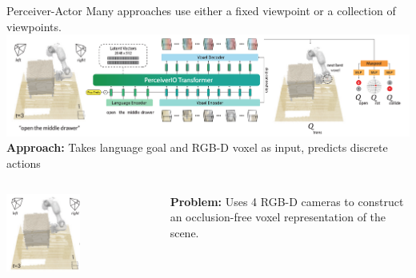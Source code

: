\documentclass{beamer}
\begin{document}
\begin{frame}[t]{Perceiver-Actor}
    \vspace{-1em}
    Many approaches use either a fixed viewpoint or a collection of viewpoints.
    \includegraphics[width=\textwidth]{./img/motivation_peract_0.png}
    \textbf{Approach:} Takes language goal and RGB-D voxel as input, predicts discrete actions 
    \pause
    \begin{columns}
		\begin{column}{.5\textwidth}
            \begin{center}
                \vspace{-1em}
                \includegraphics[width=0.5\textwidth]{./img/motivation_peract_1.png}
            \end{center}
		\end{column}
		\hspace{1em}
		\begin{column}{.5\textwidth}
            \textbf{Problem:} Uses 4 RGB-D cameras to construct an occlusion-free voxel representation of the scene.
		\end{column}
	\end{columns}
\end{frame}
\end{document}
